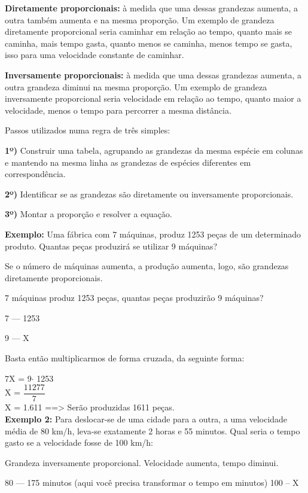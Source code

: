 \begin{multicols*}{2}
	\textbf{Diretamente proporcionais:} à medida que uma dessas grandezas aumenta, a outra também aumenta e na mesma proporção. Um exemplo de grandeza diretamente proporcional seria caminhar em relação ao tempo, quanto mais se caminha, mais tempo gasta, quanto menos se caminha, menos tempo se gasta, isso para uma velocidade constante de caminhar.

	\textbf{Inversamente proporcionais:} à medida que uma dessas grandezas aumenta, a outra grandeza diminui na mesma proporção. Um exemplo de grandeza inversamente proporcional seria velocidade em relação ao tempo, quanto maior a velocidade, menos o tempo para percorrer a mesma distância.

	Passos utilizados numa regra de três simples:

	\textbf{1º)} Construir uma tabela, agrupando as grandezas da mesma espécie em colunas e mantendo na mesma linha as grandezas de espécies diferentes em correspondência.

	\textbf{2º)} Identificar se as grandezas são diretamente ou inversamente proporcionais.

	\textbf{3º)} Montar a proporção e resolver a equação.

	\textbf{Exemplo:} Uma fábrica com 7 máquinas, produz 1253 peças de um determinado produto. Quantas peças produzirá se utilizar 9 máquinas?

	Se o número de máquinas aumenta, a produção aumenta, logo, são grandezas diretamente proporcionais.

	7 máquinas produz 1253 peças, quantas peças produzirão 9 máquinas?

	7  ---   1253

	9  ---      X

	Basta então multiplicarmos de forma cruzada, da seguinte forma:

	7X = 9$\cdot$ 1253  \\

	X = $\dfrac{11277}{7}$\\

	X = 1.611  ==> Serão produzidas 1611 peças.\\

	\textbf{Exemplo 2:} Para deslocar-se de uma cidade para a outra, a uma velocidade média de 80 km/h, leva-se exatamente 2 horas e 55 minutos. Qual seria o tempo gasto se a velocidade fosse de 100 km/h:

	Grandeza inversamente proporcional. Velocidade aumenta, tempo diminui.

	80  ---  175 minutos (aqui você precisa transformar o tempo em minutos)
	100 --    X


\end{multicols*}
